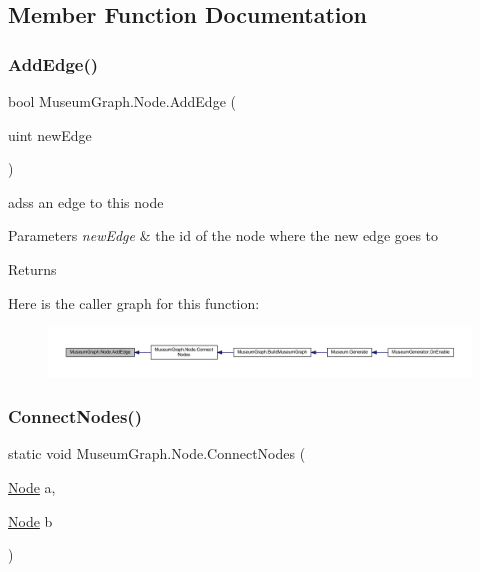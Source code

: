 \subsection{Member Function Documentation}
\mbox{\label{class_museum_graph_1_1_node_adecbc3b471d15c5480d4c13e9502ac27}} 
\subsubsection{\texorpdfstring{Add\+Edge()}{AddEdge()}}
{\footnotesize\ttfamily bool Museum\+Graph.\+Node.\+Add\+Edge (\begin{DoxyParamCaption}\item[{uint}]{new\+Edge }\end{DoxyParamCaption})}



adss an edge to this node 


\begin{DoxyParams}{Parameters}
{\em new\+Edge} & the id of the node where the new edge goes to\\
\hline
\end{DoxyParams}
\begin{DoxyReturn}{Returns}

\end{DoxyReturn}
Here is the caller graph for this function\+:
\nopagebreak
\begin{figure}[H]
\begin{center}
\leavevmode
\includegraphics[width=350pt]{class_museum_graph_1_1_node_adecbc3b471d15c5480d4c13e9502ac27_icgraph}
\end{center}
\end{figure}
\mbox{\label{class_museum_graph_1_1_node_afc85f1140ee37f6365863f34ac3482bc}} 
\subsubsection{\texorpdfstring{Connect\+Nodes()}{ConnectNodes()}}
{\footnotesize\ttfamily static void Museum\+Graph.\+Node.\+Connect\+Nodes (\begin{DoxyParamCaption}\item[{\mbox{\hyperlink{class_museum_graph_1_1_node}{Node}}}]{a,  }\item[{\mbox{\hyperlink{class_museum_graph_1_1_node}{Node}}}]{b }\end{DoxyParamCaption})\hspace{0.3cm}{\ttfamily [static]}}



